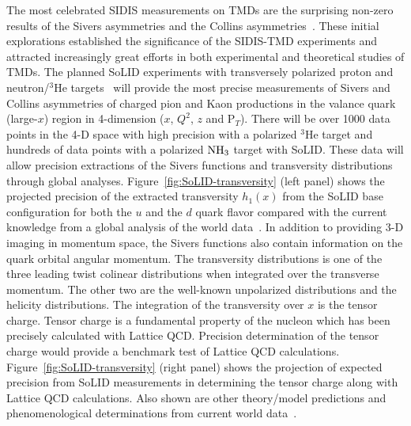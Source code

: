 The most celebrated SIDIS measurements on TMDs are the surprising non-zero results of the Sivers asymmetries and the Collins asymmetries~\cite{Airapetian_2005, Adolph_2014, Qian_2011}. These initial explorations established the significance of the SIDIS-TMD experiments and attracted increasingly great efforts in both experimental and theoretical studies of TMDs. The planned SoLID experiments with transversely polarized proton and neutron/$^3$He targets~\cite{SoLID-SIDIS-p, SoLID-SIDIS-He3-T} will provide the most precise measurements of Sivers and Collins asymmetries of charged pion and Kaon productions in the valance quark (large-$x$) region in 4-dimension ($x$, $Q^2$, $z$ and P$_T$).
There will be over 1000 data points in the 4-D space with high precision with a polarized $^3$He target and hundreds of data points with a polarized ${\rm NH}_{3}$ target with SoLID. These data will allow precision extractions of the Sivers functions and transversity distributions through global analyses. 
Figure~\ref{fig:SoLID-transversity} (left panel) shows the projected precision of the extracted transversity $h_{1}(x)$ from the SoLID base configuration for both the $u$ and the $d$ quark flavor compared with the current knowledge from a global analysis of the world data~\cite{YE201791}.  
In addition to providing 3-D imaging in momentum space, the Sivers functions also contain information on the quark orbital angular momentum. The transversity distributions is one of the three leading twist colinear distributions when integrated over the transverse momentum. The other two are the well-known unpolarized distributions and the helicity distributions. The integration of the transversity over $x$ is the tensor
charge. Tensor charge is a fundamental property of the nucleon which has been precisely calculated with Lattice QCD. Precision determination of the tensor charge would provide a benchmark test of Lattice QCD calculations. Figure~\ref{fig:SoLID-transversity} (right panel) shows the projection of expected precision from SoLID measurements in determining the tensor charge along with Lattice QCD calculations. Also shown are other theory/model predictions and phenomenological determinations from current world data~\cite{YE201791}.


